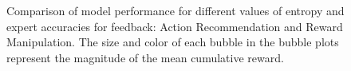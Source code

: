 \begin{figure}[!thb]
    \caption{Comparison of model performance for different values of entropy and expert accuracies for feedback: Action Recommendation and Reward Manipulation. The size and color of each bubble in the bubble plots represent the magnitude of the mean cumulative reward.}
    \label{fig:entr_thresh_expert_acc_ar_rp}
\end{figure}

        
       
        
        
    
        
        

